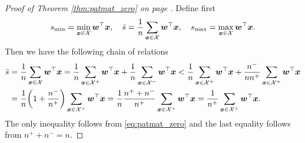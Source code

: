 \patmatzero*
\begin{proof}[Proof of Theorem \ref{thm:patmat_zero} on page \pageref{thm:patmat_zero}]
  Define first
  \begin{equation*}
    \begin{aligned}
      s_{\min} = \min_{\bm{x} \in \mathcal{X}}\bm{w}^\top \bm{x}, \quad
      \bar{s} = \frac{1}{n}\sum_{\bm{x} \in \mathcal{X}}\bm{w}^\top \bm{x} , \quad
      s_{\max} = \max_{\bm{x} \in \mathcal{X}}\bm{w}^\top \bm{x}.
    \end{aligned}
  \end{equation*}
  Then we have the following chain of relations
  \begin{equation}\label{eq:patmat_zero_aux0}
    \begin{aligned}
      \bar{s}
      & = \frac{1}{n}\sum_{\bm{x} \in \Xc}\bm{w}^\top \bm{x}
        = \frac{1}{n}\sum_{\bm{x} \in \Xc^+}\bm{w}^\top \bm{x} + \frac{1}{n}\sum_{\bm{x} \in \Xc^-}\bm{w}^\top \bm{x}
        < \frac{1}{n}\sum_{\bm{x} \in \Xc^+}\bm{w}^\top \bm{x} + \frac{n^-}{nn^+}\sum_{\bm{x} \in \Xc^+}\bm{w}^\top \bm{x} \\
      & = \frac 1n\left(1+\frac{n^-}{n^+}\right)\sum_{\bm{x} \in \Xc^+}\bm{w}^\top \bm{x}
        = \frac 1n\frac{n^++n^-}{n^+}\sum_{\bm{x} \in \Xc^+}\bm{w}^\top \bm{x} = \frac 1{n^+}\sum_{\bm{x} \in \Xc^+}\bm{w}^\top \bm{x}.
    \end{aligned}
  \end{equation}
  The only inequality follows from \eqref{eq:patmat_zero} and the last equality follows from $n^++n^-=n$.
  

\end{proof}
